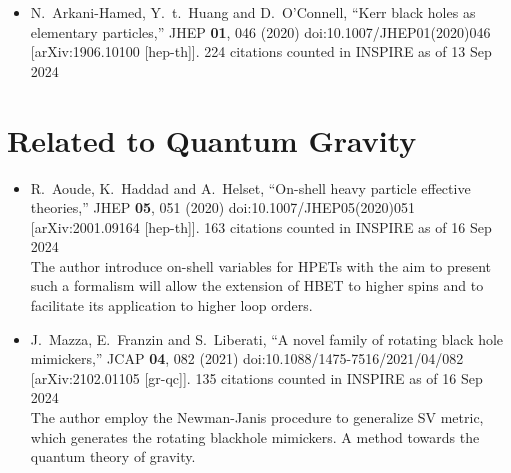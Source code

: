 \documentclass[a4paper,12pt]{article}
\title{}
\author{}
\begin{document}
    \begin{itemize}
        \item %
        N.~Arkani-Hamed, Y.~t.~Huang and D.~O'Connell,
        ``Kerr black holes as elementary particles,''
        JHEP \textbf{01}, 046 (2020)
        doi:10.1007/JHEP01(2020)046
        [arXiv:1906.10100 [hep-th]].
        224 citations counted in INSPIRE as of 13 Sep 2024
    \end{itemize}
\section*{Related to Quantum Gravity}
\begin{itemize}
    \item %
    R.~Aoude, K.~Haddad and A.~Helset,
    ``On-shell heavy particle effective theories,''
    JHEP \textbf{05}, 051 (2020)
    doi:10.1007/JHEP05(2020)051
    [arXiv:2001.09164 [hep-th]].
    163 citations counted in INSPIRE as of 16 Sep 2024\\
    The author introduce on-shell variables for HPETs with the aim to present such a formalism will allow the extension of
    HBET to higher spins and to facilitate its application to higher loop orders. 
    \item %
    J.~Mazza, E.~Franzin and S.~Liberati,
    ``A novel family of rotating black hole mimickers,''
    JCAP \textbf{04}, 082 (2021)
    doi:10.1088/1475-7516/2021/04/082
    [arXiv:2102.01105 [gr-qc]].
    135 citations counted in INSPIRE as of 16 Sep 2024\\
    The author employ the Newman-Janis procedure to generalize SV metric, which generates the rotating blackhole mimickers. A method towards the quantum theory of gravity.
\end{itemize}
\end{document}
